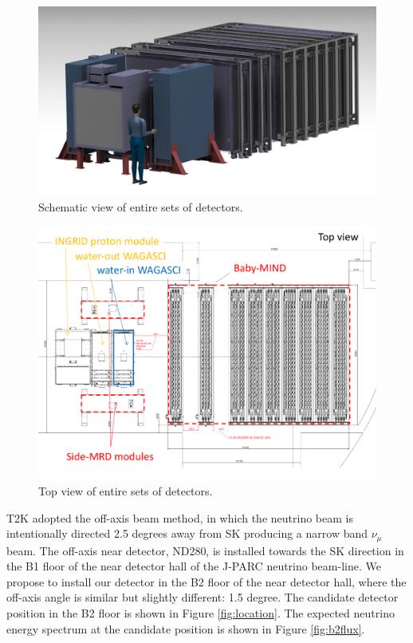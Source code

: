 \begin{figure}[tbh]
\begin{center}
\includegraphics[width=0.8\linewidth]{fig/wagasci_smrd_babymind.pdf}
\end{center}
\caption{
Schematic view of entire sets of detectors.
}
\label{fig:all_detector}
\end{figure}

\begin{figure}[tbh]
\begin{center}
\includegraphics[width=0.8\linewidth]{fig/wagasci_smrd_babymind_topview.pdf}
\end{center}
\caption{
Top view of entire sets of detectors.
}
\label{fig:all_detector_topview}
\end{figure}


T2K adopted the off-axis beam method, in which
the neutrino beam is intentionally directed 2.5 degrees away from SK producing a narrow band $\nu_{\mu}$ beam.
The off-axis near detector, ND280, is installed towards the SK direction in the B1 floor of the near detector hall of the J-PARC neutrino beam-line.
We propose to install our detector in the B2 floor of the near detector hall, 
where the off-axis angle is similar but slightly different: 1.5 degree.
The candidate detector position in the B2 floor is shown in Figure \ref{fig:location}.
The expected neutrino energy spectrum at the candidate position is shown in Figure \ref{fig:b2flux}.

